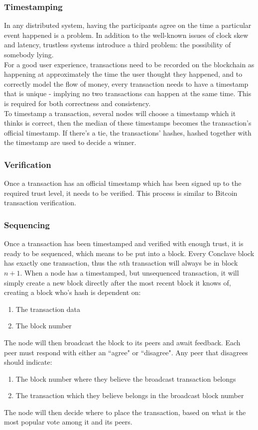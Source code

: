 \documentclass{report}
\begin{document}
			\subsubsection{Timestamping} 
				In any distributed system, having the participants agree on the time a particular event happened is a problem. In addition to the well-known issues of clock skew and latency, trustless systems introduce a third problem: the possibility of somebody lying. \\

				For a good user experience, transactions need to be recorded on the blockchain as happening at approximately the time the user thought they happened, and to correctly model the flow of money, every transaction needs to have a timestamp that is unique - implying no two transactions can happen at the same time. This is required for both correctness and consistency. \\

				To timestamp a transaction, several nodes will choose a timestamp which it thinks is correct, then the median of these timestamps becomes the transaction's official timestamp. If there's a tie, the transactions' hashes, hashed together with the timestamp are used to decide a winner.
			\subsubsection{Verification}
				Once a transaction has an official timestamp which has been signed up to the required trust level, it needs to be verified. This process is similar to Bitcoin transaction verification. 
			\subsubsection{Sequencing} 
				Once a transaction has been timestamped and verified with enough trust, it is ready to be sequenced, which means to be put into a block. Every Conclave block has exactly one transaction, thus the $n$th transaction will always be in block $n + 1$. When a node has a timestamped, but unsequenced transaction, it will simply create a new block directly after the most recent block it knows of, creating a block who's hash is dependent on:
				\begin{enumerate}
					\item The transaction data
					\item The block number
				\end{enumerate}
				The node will then broadcast the block to its peers and await feedback. Each peer must respond with either an ``agree" or ``disagree". Any peer that disagrees should indicate:
				\begin{enumerate}
					\item The block number where they believe the broadcast transaction belongs
					\item The transaction which they believe belongs in the broadcast block number
				\end{enumerate}
				The node will then decide where to place the transaction, based on what is the most popular vote among it and its peers.
\end{document}
